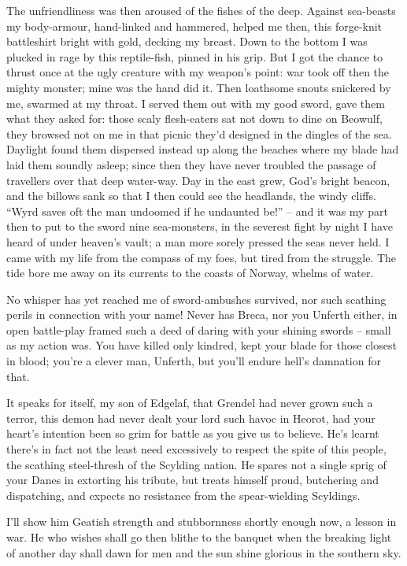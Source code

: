 \documentclass[a4paper]{article}
\begin{document}
{The unfriendliness was then aroused of the fishes of the deep.
Against sea-beasts my body-armour,
hand-linked and hammered, helped me then,
this forge-knit battleshirt bright with gold,
decking my breast. Down to the bottom
I was plucked in rage by this reptile-fish,
pinned in his grip. But I got the chance
to thrust once at the ugly creature
with my weapon’s point: war took off then
the mighty monster; mine was the hand did it.
Then loathsome snouts snickered by me,
swarmed at my throat. I served them out
with my good sword, gave them what they asked for:
those scaly flesh-eaters sat not down
to dine on Beowulf, they browsed not on me
in that picnic they’d designed in the dingles of the sea.
Daylight found them dispersed instead
up along the beaches where my blade had laid them
soundly asleep; since then they have never
troubled the passage of travellers over
that deep water-way. Day in the east grew,
God’s bright beacon, and the billows sank
so that I then could see the headlands,
the windy cliffs. “Wyrd saves oft
the man undoomed if he undaunted be!” –
and it was my part then to put to the sword
nine sea-monsters, in the severest fight
by night I have heard of under heaven’s vault;
a man more sorely pressed the seas never held.
I came with my life from the compass of my foes,
but tired from the struggle. The tide bore me
away on its currents to the coasts of Norway,
whelms of water.

No whisper has yet reached me
of sword-ambushes survived, nor such scathing perils
in connection with your name! Never has Breca,
nor you Unferth either, in open battle-play
framed such a deed of daring with your
shining swords – small as my action was.
You have killed only kindred, kept your blade
for those closest in blood; you’re a clever man, Unferth,
but you’ll endure hell’s damnation for that.

It speaks for itself, my son of Edgelaf,
that Grendel had never grown such a terror,
this demon had never dealt your lord
such havoc in Heorot, had your heart’s intention
been so grim for battle as you give us to believe.
He’s learnt there’s in fact not the least need
excessively to respect the spite of this people,
the scathing steel-thresh of the Scylding nation.
He spares not a single sprig of your Danes
in extorting his tribute, but treats himself proud,
butchering and dispatching, and expects no resistance
from the spear-wielding Scyldings.

I’ll show him Geatish
strength and stubbornness shortly enough now,
a lesson in war. He who wishes shall go then
blithe to the banquet when the breaking light
of another day shall dawn for men
and the sun shine glorious in the southern sky.

}
\end{document}
